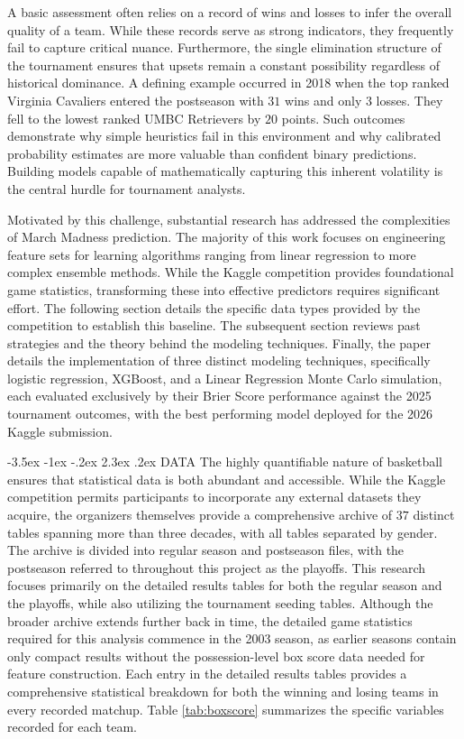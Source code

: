 \documentclass[12pt,leqno]{article}\usepackage[pdftex]{graphicx}\usepackage[dvipsnames]{xcolor}
\makeatletter
\renewcommand\section{\@startsection {section}{1}{\z@}%
{-3.5ex \@plus -1ex \@minus -.2ex}%
{2.3ex \@plus.2ex}%
{\normalfont\centering}}
\theoremstyle{remark}
\makeatother
\begin{document}
A basic assessment often relies on a record of wins and losses to infer the overall quality of a team. While these records serve as strong indicators, they frequently fail to capture critical nuance. Furthermore, the single elimination structure of the tournament ensures that upsets remain a constant possibility regardless of historical dominance. A defining example occurred in 2018 when the top ranked Virginia Cavaliers entered the postseason with $31$ wins and only $3$ losses. They fell to the lowest ranked UMBC Retrievers by $20$ points. Such outcomes demonstrate why simple heuristics fail in this environment and why calibrated probability estimates are more valuable than confident binary predictions. Building models capable of mathematically capturing this inherent volatility is the central hurdle for tournament analysts. 

Motivated by this challenge, substantial research has addressed the complexities of March Madness prediction. The majority of this work focuses on engineering feature sets for learning algorithms ranging from linear regression to more complex ensemble methods. While the Kaggle competition provides foundational game statistics, transforming these into effective predictors requires significant effort. The following section details the specific data types provided by the competition to establish this baseline. The subsequent section reviews past strategies and the theory behind the modeling techniques. Finally, the paper details the implementation of three distinct modeling techniques, specifically logistic regression, XGBoost, and a Linear Regression Monte Carlo simulation, each evaluated exclusively by their Brier Score performance against the 2025 tournament outcomes, with the best performing model deployed for the 2026 Kaggle submission.

\newpage
\section{DATA}
The highly quantifiable nature of basketball ensures that statistical data is both abundant and accessible. While the Kaggle competition permits participants to incorporate any external datasets they acquire, the organizers themselves provide a comprehensive archive of $37$ distinct tables spanning more than three decades, with all tables separated by gender. The archive is divided into regular season and postseason files, with the postseason referred to throughout this project as the playoffs. This research focuses primarily on the detailed results tables for both the regular season and the playoffs, while also utilizing the tournament seeding tables. Although the broader archive extends further back in time, the detailed game statistics required for this analysis commence in the 2003 season, as earlier seasons contain only compact results without the possession-level box score data needed for feature construction. Each entry in the detailed results tables provides a comprehensive statistical breakdown for both the winning and losing teams in every recorded matchup. Table \ref{tab:boxscore} summarizes the specific variables recorded for each team.
\end{document}
